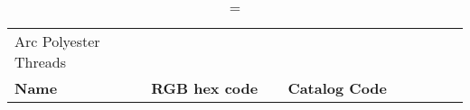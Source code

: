 
\begin{longtable}{p{0.3\linewidth} p{0.3\linewidth} p{0.4\linewidth}}
\caption = {Arc Polyester Threads}
\label{tblr:arcpoly}\\
\textbf{Name} & \textbf{RGB hex code} & \textbf{Catalog Code} \\

\end{longtable}
